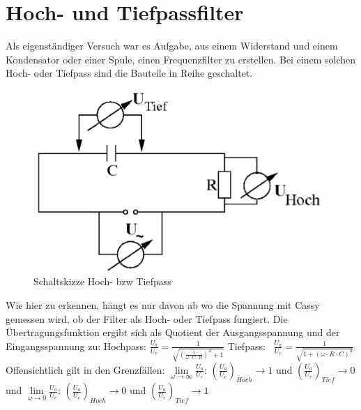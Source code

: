 \documentclass[a4paper, 11pt]{article}
\begin{document}
\section{Hoch- und Tiefpassfilter}
Als eigenständiger Versuch war es Aufgabe, aus einem Widerstand und einem Kondensator oder einer Spule, einen Frequenzfilter zu erstellen. Bei einem solchen Hoch- oder Tiefpass sind die Bauteile in Reihe geschaltet.
\newline
\begin{figure}[H]
	\hskip -0.5cm
	\includegraphics[trim = 0mm 0mm 0mm 0mm,clip, width=11cm]{Bilder/Schaltskizze_Filter.png}%
	\caption[Schaltskizze Hoch- bzw Tiefpass]{Schaltskizze Hoch- bzw Tiefpass}%
	\label{pic:Abbildung 1}%
\end{figure}
Wie hier zu erkennen, hängt es nur davon ab wo die Spannung mit Cassy gemessen wird, ob der Filter als Hoch- oder Tiefpass fungiert. Die Übertragungsfunktion ergibt sich als Quotient der Ausgangsspannung und der Eingangsspannung zu:
\newline
\newline
Hochpass: $\frac{U_a}{U_e}=\frac{1}{\sqrt{(\frac{1}{\omega \cdot C \cdot R})^2+1}}$ 
\newline
Tiefpass: \, $\frac{U_a}{U_e}=\frac{1}{\sqrt{1+(\omega \cdot R \cdot C)^2}}$
\newline
\newline
Offensichtlich gilt in den Grenzfällen: 
\newline
\newline
$\lim\limits_{\omega \rightarrow \infty}{\frac{U_a}{U_e}}$:\;\;\; $(\frac{U_a}{U_e})_{Hoch} \rightarrow  1$ und $(\frac{U_a}{U_e})_{Tief} \rightarrow 0$
\newline und
\newline
 $\lim\limits_{\omega  \to 0}{\frac{U_a}{U_e}}$:  \;\;\; $(\frac{U_a}{U_e})_{Hoch} \rightarrow  0$ und $(\frac{U_a}{U_e})_{Tief} \rightarrow 1$
\end{document}
